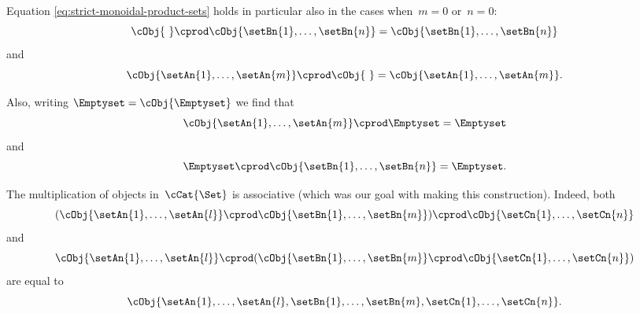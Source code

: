 Equation \cref{eq:strict-monoidal-product-sets} holds in particular also in the cases when~$m = 0$ or~$n =0$:
\begin{equation*}
    \cObj{ \ } \cprod \cObj{\setBn{1}, \ldots, \setBn{n}} = \cObj{\setBn{1}, \ldots, \setBn{n}}
\end{equation*}
and
\begin{equation*}
    \cObj{\setAn{1}, \ldots, \setAn{m}} \cprod \cObj{ \ } = \cObj{\setAn{1}, \ldots, \setAn{m}}.
\end{equation*}

Also, writing $\Emptyset = \cObj{\Emptyset}$ we find that 
\begin{equation*}
    \cObj{\setAn{1}, \ldots, \setAn{m}} \cprod \Emptyset = \Emptyset
\end{equation*}
and
\begin{equation*}
    \Emptyset \cprod \cObj{\setBn{1}, \ldots, \setBn{n}} = \Emptyset.
\end{equation*}

\begin{remark}
    The multiplication of objects in~$\cCat{\Set}$ is associative (which was our goal with making this construction). Indeed, both
    \begin{equation*}
        ( \cObj{\setAn{1}, \ldots, \setAn{l}} \cprod \cObj{\setBn{1}, \ldots, \setBn{m}}) \cprod \cObj{\setCn{1}, \ldots, \setCn{n}}
    \end{equation*}
    and
    \begin{equation*}
        \cObj{\setAn{1}, \ldots, \setAn{l}} \cprod (\cObj{\setBn{1}, \ldots, \setBn{m}} \cprod \cObj{\setCn{1}, \ldots, \setCn{n}})
    \end{equation*}
    are equal to
    \begin{equation*}
        \cObj{\setAn{1}, \ldots, \setAn{l}, \setBn{1}, \ldots, \setBn{m}, \setCn{1}, \ldots, \setCn{n}}.
    \end{equation*}
\end{remark}
